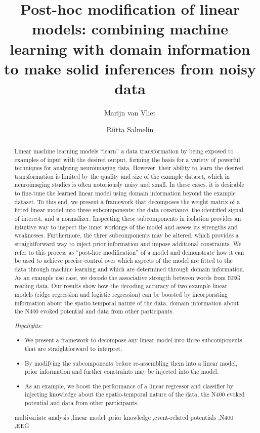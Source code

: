 \documentclass[a4paper]{vanvliet_paper}
\author[1*]{Marijn van Vliet}
\author[1]{Riitta Salmelin}
\affil[1]{Department of Neuroscience and Biomedical Engineering, Aalto University}
\affil[*]{Corresponding author: marijn.vanvliet@aalto.fi}
\title{Post-hoc modification of linear models: combining machine learning with domain information to make solid inferences from noisy data}
\begin{document}
\maketitle

\begin{abstract}

Linear machine learning models ``learn'' a data transformation by being exposed to examples of input with the desired output, forming the basis for a variety of powerful techniques for analyzing neuroimaging data.
However, their ability to learn the desired transformation is limited by the quality and size of the example dataset, which in neuroimaging studies is often notoriously noisy and small.
In these cases, it is desirable to fine-tune the learned linear model using domain information beyond the example dataset.
To this end, we present a framework that decomposes the weight matrix of a fitted linear model into three subcomponents: the data covariance, the identified signal of interest, and a normalizer.
Inspecting these subcomponents in isolation provides an intuitive way to inspect the inner workings of the model and assess its strengths and weaknesses.
Furthermore, the three subcomponents may be altered, which provides a straightforward way to inject prior information and impose additional constraints.
We refer to this process as ``post-hoc modification'' of a model and demonstrate how it can be used to achieve precise control over which aspects of the model are fitted to the data through machine learning and which are determined through domain information.
As an example use case, we decode the associative strength between words from \gls{EEG} reading data.
Our results show how the decoding accuracy of two example linear models (ridge regression and logistic regression) can be boosted by incorporating information about the spatio-temporal nature of the data, domain information about the N400 evoked potential and data from other participants.

\vspace{0.5cm}

\textit{Highlights:}
\begin{itemize}
    \item We present a framework to decompose any linear model into three subcomponents that are straightforward to interpret.
    \item By modifying the subcomponents before re-assembling them into a linear model, prior information and further constraints may be injected into the model.
    \item As an example, we boost the performance of a linear regressor and classifier by injecting knowledge about the spatio-temporal nature of the data, the N400 evoked potential and data from other participants. 
\end{itemize}


\begin{keyword}
    multivariate analysis \sep linear model \sep prior knowledge \sep event-related potentials \sep N400 \sep EEG
\end{keyword}

\end{abstract}
\end{document}
